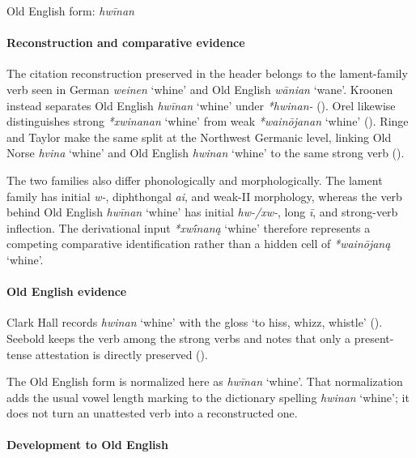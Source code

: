 \documentclass[
  british,
  a4paper,
]{article}
\providecommand{\Recon}[1]{\emph{*#1}}
\begin{document}
Old English form: \emph{hwīnan}

\paragraph{Reconstruction and comparative
evidence}\label{reconstruction-and-comparative-evidence-113}

The citation reconstruction preserved in the header belongs to the
lament-family verb seen in German {\emph{weinen}} `whine' and Old
English {\emph{wānian}} `wane'. Kroonen instead separates Old English
{\emph{hwīnan}} `whine' under \emph{*hwinan-}
(). Orel likewise
distinguishes strong \Recon{xwinanan} `whine' from weak
\Recon{wainōjanan} `whine' ().
Ringe and Taylor make the same split at the Northwest Germanic level,
linking Old Norse {\emph{hvina}} `whine' and Old English {\emph{hwinan}}
`whine' to the same strong verb ().

The two families also differ phonologically and morphologically. The
lament family has initial \emph{w-}, diphthongal \emph{ai}, and weak-II
morphology, whereas the verb behind Old English \emph{hwīnan} `whine'
has initial \emph{hw-/xw-}, long \emph{ī}, and strong-verb inflection.
The derivational input \Recon{xwī́naną} `whine' therefore represents a
competing comparative identification rather than a hidden cell of
\Recon{wainōjaną} `whine'.

\paragraph{Old English evidence}\label{old-english-evidence-113}

Clark Hall records {\emph{hwinan}} `whine' with the gloss `to hiss,
whizz, whistle' ().
Seebold keeps the verb among the strong verbs and notes that only a
present-tense attestation is directly preserved
().

The Old English form is normalized here as {\emph{hwīnan}} `whine'. That
normalization adds the usual vowel length marking to the dictionary
spelling {\emph{hwinan}} `whine'; it does not turn an unattested verb
into a reconstructed one.

\paragraph{Development to Old
English}\label{development-to-old-english-113}
\end{document}
